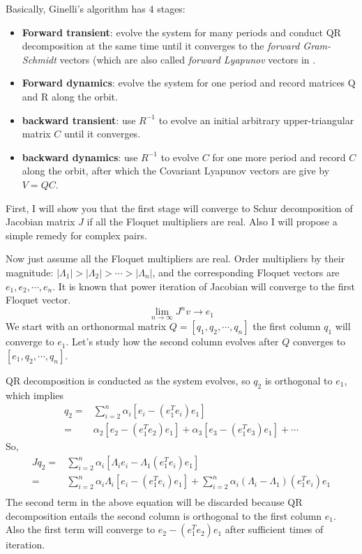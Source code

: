 Basically, Ginelli's algorithm has 4 stages:
\begin{itemize}
\item \textbf{Forward transient}: evolve the system for many periods and
  conduct QR decomposition at the same time
  until it converges to the \textit{forward Gram-Schmidt} vectors
   (which are also called \textit{forward Lyapunov} vectors
  in . 
\item \textbf{Forward dynamics}: evolve the system for one period and
  record matrices Q and R along the orbit.
\item \textbf{backward transient}: use $R^{-1}$ to evolve an initial
  arbitrary upper-triangular matrix $C$ until it converges.
\item \textbf{backward dynamics}: use $R^{-1}$ to evolve $C$ for one
  more period and record $C$ along the orbit, after
  which the Covariant Lyapunov vectors are give by
  $V=QC$.
\end{itemize}

First, I will show you that the first stage will converge to Schur
decomposition of Jacobian matrix $J$ if all the Floquet multipliers are
real. Also I will propose a simple remedy for complex pairs.

Now just assume all the Floquet multipliers are real. Order
multipliers by their magnitude:
$|\Lambda_{1}|>|\Lambda_{2}|>\cdots >|\Lambda_{n}|$, and the
corresponding Floquet vectors are $e_{1},e_{2},\cdots ,e_{n}$.
It is known that power iteration of Jacobian will converge to
the first Floquet vector.
\[
 \lim_{n\to \infty }J^{n}v\to e_{1}
\]
We start with an orthonormal matrix $Q=[q_{1},q_{2},\cdots ,q_{n}]$
the first column
$q_{1}$ will converge to $e_{1}$. Let's study how the second column evolves
after $Q$ converges to $[e_{1},q_{2},\cdots , q_{n}]$.

QR decomposition is conducted as the system evolves, so $q_{2}$ is
orthogonal to $e_{1}$, which implies
\begin{align*}
q_{2}= & \sum_{i=2}^{n}\alpha_{i}[e_{i}-(e_{1}^{T}e_{i})e_{1}] \\
    = & \alpha_{2}[e_{2}-(e_{1}^{T}e_{2})e_{1}]+
    \alpha_{3}[e_{3}-(e_{1}^{T}e_{3})e_{1}]+ \cdots
\end{align*}
So,
\begin{align*}
  Jq_{2}= &\sum_{i=2}^{n}\alpha_{i}[\Lambda_{i}e_{i}-
  \Lambda_{1}(e_{1}^{T}e_{i})e_{1}] \\
  = & \sum_{i=2}^{n}\alpha_{i}\Lambda_{i}[e_{i}-
  (e_{1}^{T}e_{i})e_{1}]+\sum_{i=2}^{n}\alpha_{i}
  (\Lambda_{i}-\Lambda_{1})(e_{1}^{T}e_{i})e_{1} \\
\end{align*}
The second term in the above equation will be discarded because QR
decomposition entails the second column is orthogonal to the first
column $e_{1}$. Also the first term will converge to
 $e_{2}-(e_{1}^{T}e_{2})e_{1}$ after sufficient times of iteration.

